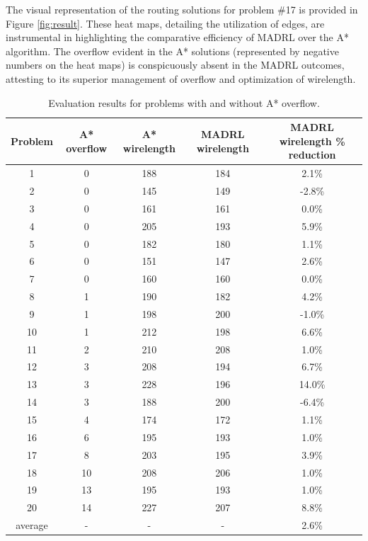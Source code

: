\documentclass[conference]{IEEEtran}
\begin{document}
The visual representation of the routing solutions for problem \#17 is provided in Figure \ref{fig:result}. These heat maps, detailing the utilization of edges, are instrumental in highlighting the comparative efficiency of MADRL over the A* algorithm. The overflow evident in the A* solutions (represented by negative numbers on the heat maps) is conspicuously absent in the MADRL outcomes, attesting to its superior management of overflow and optimization of wirelength.

\begin{table}[h!]
    \caption{Evaluation results for problems with and without A* overflow.}
    \centering
    \begin{tabular}{|c c c c c|}
        \hline
        \hline
        Problem & A* overflow & A* wirelength & MADRL wirelength & MADRL wirelength \% reduction \\
        \hline
        1 & 0 & 188 & 184 & 2.1\% \\
        2 & 0 & 145 & 149 & -2.8\% \\
        3 & 0 & 161 & 161 & 0.0\% \\
        4 & 0 & 205 & 193 & 5.9\% \\
        5 & 0 & 182 & 180 & 1.1\% \\
        6 & 0 & 151 & 147 & 2.6\% \\
        7 & 0 & 160 & 160 & 0.0\% \\
        8 & 1 & 190 & 182 & 4.2\% \\
        9 & 1 & 198 & 200 & -1.0\% \\
        10 & 1 & 212 & 198 & 6.6\% \\
        11 & 2 & 210 & 208 & 1.0\% \\
        12 & 3 & 208 & 194 & 6.7\% \\
        13 & 3 & 228 & 196 & 14.0\% \\
        14 & 3 & 188 & 200 & -6.4\% \\
        15 & 4 & 174 & 172 & 1.1\% \\
        16 & 6 & 195 & 193 & 1.0\% \\
        17 & 8 & 203 & 195 & 3.9\% \\
        18 & 10 & 208 & 206 & 1.0\% \\
        19 & 13 & 195 & 193 & 1.0\% \\
        20 & 14 & 227 & 207 & 8.8\% \\
        average & - & - & - & 2.6\% \\
        \hline
        \hline
    \end{tabular}
    \label{tab:result}
    \end{table} 
\end{document}
